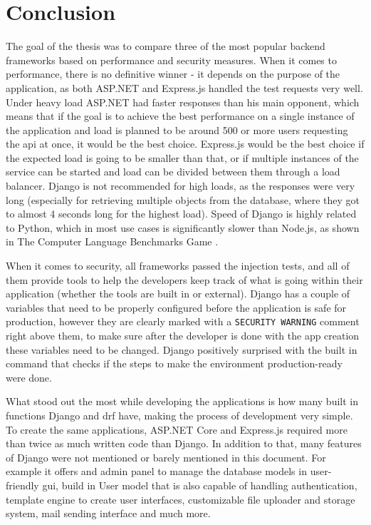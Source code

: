 
\chapter{Conclusion}

The goal of the thesis was to compare three of the most popular backend frameworks based on performance and security measures. When it comes to performance, there is no definitive winner - it depends on the purpose of the application, as both ASP.NET and Express.js handled the test requests very well. Under heavy load ASP.NET had faster responses than his main opponent, which means that if the goal is to achieve the best performance on a single instance of the application and load is planned to be around 500 or more users requesting the \acrshort{api} at once, it would be the best choice. Express.js would be the best choice if the expected load is going to be smaller than that, or if multiple instances of the service can be started and load can be divided between them through a load balancer. Django is not recommended for high loads, as the responses were very long (especially for retrieving multiple objects from the database, where they got to almost 4 seconds long for the highest load). Speed of Django is highly related to Python, which in most use cases is significantly slower than Node.js, as shown in The Computer Language Benchmarks Game \cite{benchmarksGame}.

When it comes to security, all frameworks passed the injection tests, and all of them provide tools to help the developers keep track of what is going within their application (whether the tools are built in or external). Django has a couple of variables that need to be properly configured before the application is safe for production, however they are clearly marked with a \lstinline{SECURITY WARNING} comment right above them, to make sure after the developer is done with the app creation these variables need to be changed. Django positively surprised with the built in command that checks if the steps to make the environment production-ready were done.

What stood out the most while developing the applications is how many built in functions Django and \acrshort{drf} have, making the process of development very simple. To create the same applications, ASP.NET Core and Express.js required more than twice as much written code than Django. In addition to that, many features of Django were not mentioned or barely mentioned in this document. For example it offers and admin panel to manage the database models in user-friendly \acrshort{gui}, build in User model that is also capable of handling authentication, template engine to create user interfaces, customizable file uploader and storage system, mail sending interface and much more.

